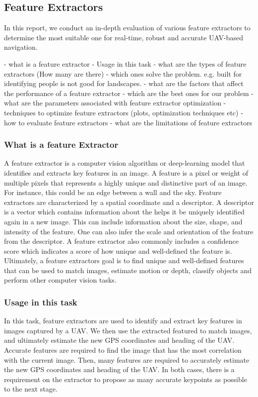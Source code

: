 \subsection*{Feature Extractors}
In this report, we conduct an in-depth evaluation of various feature extractors to determine the most suitable one for real-time, robust and accurate UAV-based navigation. 


- what is a feature extractor   
- Usage in this task
- what are the types of feature extractors (How many are there)
- which ones solve the problem. e.g. built for identifying people is not good for landscapes. 
- what are the factors that affect the performance of a feature extractor 
- which are the best ones for our problem
- what are the parameters associated with feature extractor optimization 
- techniques to optimize feature extractors (plots, optimization techniques etc)
- how to evaluate feature extractors
- what are the limitations of feature extractors


\subsubsection*{What is a feature Extractor}
A feature extractor is a computer vision algorithm or deep-learning model that identifies and extracts key features in an image. A feature is a pixel or weight of multiple pixels that represents a highly unique and distinctive part of an image. For instance, this could be an edge between a wall and the sky. Feature extractors are characterized by a spatial coordinate and a descriptor. A descriptor is a vector which contains information about the helps it be uniquely identified again in a new image. This can include information about the size, shape, and intensity of the feature. One can also infer the scale and orientation of the feature from the descriptor. A feature extractor also commonly includes a confidence score which indicates a score of how unique and well-defined the feature is. Ultimately, a feature extractors goal is to find unique and well-defined features that can be used to match images, estimate motion or depth, classify objects and perform other computer vision tasks.

\subsubsection*{Usage in this task}
In this task, feature extractors are used to identify and extract key features in images captured by a UAV. We then use the extracted featured to match images, and ultimately estimate the new GPS coordinates and heading of the UAV. Accurate features are required to find the image that has the most correlation with the current image. Then, many features are required to accurately estimate the new GPS coordinates and heading of the UAV. In both cases, there is a requirement on the extractor to propose as many accurate keypoints as possible to the next stage. 

